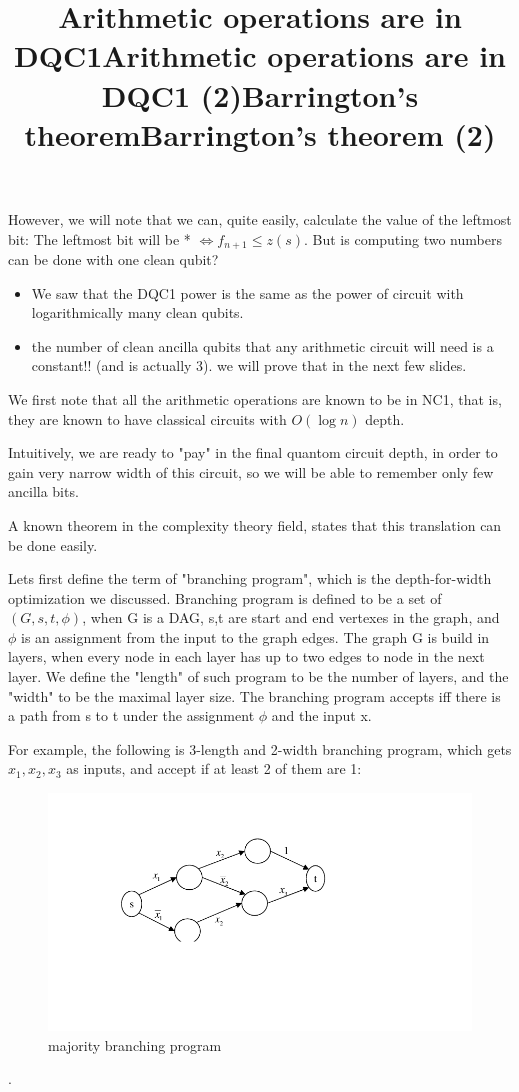 \documentclass{article}
\begin{document}
However, we will note that we can, quite easily, calculate the value of the leftmost bit: The leftmost bit will be * $\iff f_{n+1} \leq z(s)$. But is computing two numbers can be done with one clean qubit?


\title{Arithmetic operations are in DQC1}
\begin{itemize}
\item We saw that the DQC1 power is the same as the power of circuit with logarithmically many clean qubits. 

\item the number of clean ancilla qubits that any arithmetic circuit will need is a constant!! (and is actually 3). we will prove that in the next few slides. 
\end{itemize}



\title{Arithmetic operations are in DQC1 (2)}
We first note that all the arithmetic operations are known to be in NC1, that is, they are known to have classical circuits with $O(\log{n})$ depth.

Intuitively, we are ready to "pay" in the final quantom circuit depth, in order to gain very narrow width of this circuit, so we will be able to remember only few ancilla bits.

A known theorem in the complexity theory field, states that this translation can be done easily. 



\title{Barrington's theorem}
Lets first define the term of "branching program", which is the depth-for-width optimization we discussed. Branching program is defined to be a set of $(G,s,t,\phi)$, when G is a DAG, s,t are start and end vertexes in the graph, and $\phi$ is an assignment from the input to the graph edges. The graph G is build in layers, when every node in each layer has up to two edges to node in the next layer. We define the "length" of such program to be the number of layers, and the "width" to be the maximal layer size. The branching program accepts iff there is a path from s to t under the assignment $\phi$ and the input x. 


\title{Barrington's theorem (2)}
For example, the following is 3-length and 2-width branching program, which gets $x_{1},x_{2},x_{3}$ as inputs, and accept if at least 2 of them are 1:
\begin{figure}
\includegraphics[scale=0.5]{majority} 
\caption{majority branching program}
\end{figure}.
\end{document}
